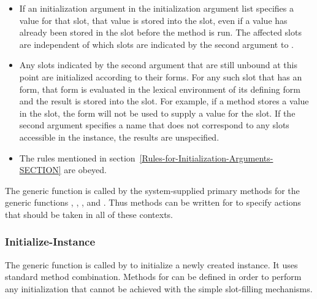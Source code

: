 \begin{itemize}

\item  If an initialization argument in the initialization
argument list specifies a value for that slot, that value is stored
into the slot, even if a value has already been stored in the slot
before the method is run.  The affected slots are independent of which
slots are indicated by the second argument to .

\item  Any slots indicated by the second argument that are still
unbound at this point are initialized according to their 
 forms.  For any such slot that has an  form,
that form is evaluated in the lexical environment of its defining 
 form and the result is stored into the slot.  For example,
if a  method stores a value in the slot, the 
 form will not be used to supply a value for the slot.  If
the second argument specifies a name that does not correspond to any
slots accessible in the instance, the results are unspecified.

\item  The rules mentioned in section~\ref{Rules-for-Initialization-Arguments-SECTION} are obeyed.

\end{itemize}

The generic function  is called by the
system-supplied primary methods for the generic functions
,
, 
, and
.
Thus methods can be written for 
 to specify actions that should be taken in all of
these contexts.


\subsubsection{Initialize-Instance}

The generic function  is called by 
 to initialize a newly created instance.  It uses
standard method combination.  Methods for 
 can be defined in order to perform any
initialization that cannot be achieved with the simple slot-filling
mechanisms.

